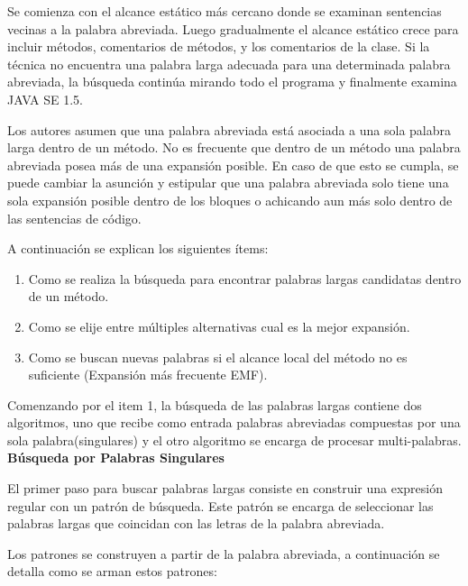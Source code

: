 \documentclass[a4paper,12pt]{report}
\begin{document}
Se comienza con el alcance estático más cercano donde se examinan sentencias vecinas a la palabra abreviada. Luego gradualmente el alcance estático crece para incluir métodos, comentarios de métodos, y los comentarios de la clase. Si la técnica no encuentra una palabra larga adecuada para una determinada palabra abreviada, la búsqueda continúa mirando todo el programa y finalmente examina JAVA SE 1.5. 

Los autores asumen que una palabra abreviada está asociada a una sola palabra larga dentro de un método. No es frecuente que dentro de un método una palabra abreviada posea más de una expansión posible. En caso de que esto se cumpla, se puede cambiar la asunción y estipular que una palabra abreviada solo tiene una sola expansión posible dentro de los bloques o achicando aun más solo dentro de las sentencias de código.

A continuación se explican los siguientes ítems: 
\begin{enumerate}
\itemsep0em%
\item Como se realiza la búsqueda para encontrar palabras largas candidatas dentro de un método. 
\item Como se elije entre múltiples alternativas cual es la mejor expansión.
\item Como se buscan nuevas palabras si el alcance local del método no es suficiente (Expansión más frecuente EMF). 
\end{enumerate}


Comenzando por el item 1, la búsqueda de las palabras largas contiene dos algoritmos, uno que recibe como entrada palabras abreviadas compuestas por una sola palabra(singulares) y el otro algoritmo se encarga de procesar multi-palabras.\\

\noindent \textbf{Búsqueda por Palabras Singulares\\}

El primer paso para buscar palabras largas consiste en construir una expresión regular con un patrón de búsqueda.  Este patrón se encarga de seleccionar las palabras largas que coincidan con las letras de la palabra abreviada.

Los patrones se construyen a partir de la palabra abreviada, a continuación se detalla como se arman estos patrones: \\
\end{document}

